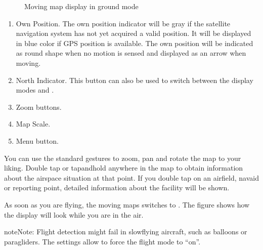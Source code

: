 \documentclass[letterpaper,10pt,english]{sphinxmanual}
\begin{document}
\begin{figure}[htbp]
\centering
\capstart

\noindent{}
\caption{Moving map display in ground mode}\label{\detokenize{01-intro/02-getting_started:id1}}\label{\detokenize{01-intro/02-getting_started:movingmapgroundmode}}\end{figure}
\begin{enumerate}
%
\item {} 
\sphinxAtStartPar
Own Position.  The own position indicator will be gray if the satellite
navigation system has not yet acquired a valid position.  It will be
displayed in blue color if GPS position is available.  The own position will
be indicated as round shape when no motion is sensed and displayed as an
arrow when moving.

\item {} 
\sphinxAtStartPar
North Indicator.  This button can also be used to switch between the display
modes  and .

\item {} 
\sphinxAtStartPar
Zoom buttons.

\item {} 
\sphinxAtStartPar
Map Scale.

\item {} 
\sphinxAtStartPar
Menu button.

\end{enumerate}

\sphinxAtStartPar
You can use the standard gestures to zoom, pan and rotate the map to your
liking.  Double tap or tap\sphinxhyphen{}and\sphinxhyphen{}hold anywhere in the map to obtain information
about the airspace situation at that point.  If you double tap on an airfield,
navaid or reporting point, detailed information about the facility will be
shown.

\sphinxAtStartPar
{}

\sphinxAtStartPar
As soon as you are flying, the moving maps switches to .  The
figure {\hyperref[\detokenize{01-intro/02-getting_started:movingmapflightmode}]{}} shows how the display will look while you are
in the air.

\begin{sphinxadmonition}{note}{Note:}
\sphinxAtStartPar
Flight detection might fail in slow\sphinxhyphen{}flying aircraft, such as balloons
or paragliders.  The settings allow to force the flight mode to “on”.
\end{sphinxadmonition}
\end{document}
